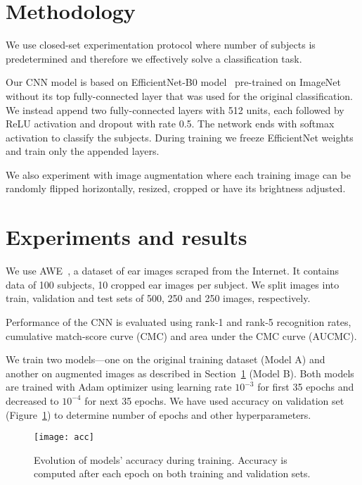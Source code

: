 \documentclass[9pt]{IEEEtran}
\begin{document}
\section{Methodology}\label{sec:meth}

We use closed-set experimentation protocol where number of subjects is predetermined and therefore we effectively solve a classification task.

Our CNN model is based on EfficientNet-B0 model~\cite{efficientNet} pre-trained on ImageNet~\cite{imageNet} without its top fully-connected layer that was used for the original classification.
We instead append two fully-connected layers with 512 units, each followed by ReLU activation and dropout with rate 0.5.
The network ends with softmax activation to classify the subjects.
During training we freeze EfficientNet weights and train only the appended layers.

We also experiment with image augmentation where each training image can be randomly flipped horizontally, resized, cropped or have its brightness adjusted.

\section{Experiments and results}

We use AWE~\cite{emersic2017ear}, a dataset of ear images scraped from the Internet.
It contains data of 100 subjects, 10 cropped ear images per subject.
We split images into train, validation and test sets of 500, 250 and 250 images, respectively.

Performance of the CNN is evaluated using rank-1 and rank-5 recognition rates, cumulative match-score curve (CMC) and area under the CMC curve (AUCMC).

We train two models---one on the original training dataset (Model A) and another on augmented images as described in Section~\ref{sec:meth} (Model B).
Both models are trained with Adam optimizer using learning rate $10^{-3}$ for first 35 epochs and decreased to $10^{-4}$ for next 35 epochs.
We have used accuracy on validation set (Figure~\ref{fig:acc}) to determine number of epochs and other hyperparameters.

\begin{figure}[ht]
    \centering
    \texttt{[image: acc]}
    \caption{Evolution of models' accuracy during training.
    Accuracy is computed after each epoch on both training and validation sets.}
    \label{fig:acc}
\end{figure}
\end{document}
